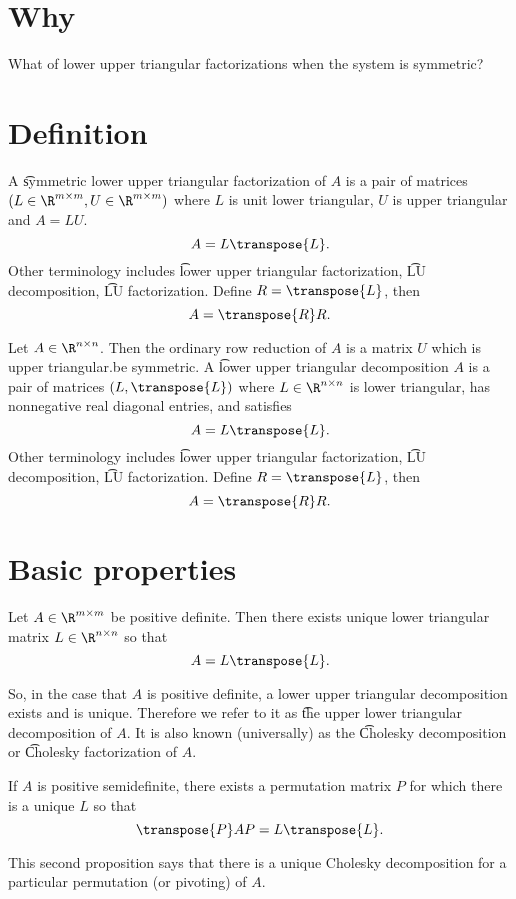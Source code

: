 

\section*{Why}

What of lower upper triangular factorizations when the system is symmetric?

\section*{Definition}

A \t{symmetric lower upper triangular factorization} of $A$ is a pair of matrices $(L \in \R ^{m \times m}, U \in \R ^{m \times m})$ where $L$ is unit lower triangular, $U$ is upper triangular and $A = LU$.
  \[
A = L\transpose{L}.
  \]
Other terminology includes \t{lower upper triangular factorization}, \t{LU decomposition}, \t{LU factorization}.
Define $R = \transpose{L}$, then
    \[
A = \transpose{R}R.
    \]

Let $A \in \R ^{n \times  n}$.
Then the ordinary row reduction of $A$ is a matrix $U$ which is upper triangular.be symmetric.
A \t{lower upper triangular decomposition}
$A$ is a pair of matrices $(L, \transpose{L})$ where $L \in \R ^{n \times n}$ is lower triangular, has nonnegative real diagonal entries, and satisfies
    \[
A = L\transpose{L}.
    \]
Other terminology includes \t{lower upper triangular factorization}, \t{LU decomposition}, \t{LU factorization}.
Define $R = \transpose{L}$, then
    \[
A = \transpose{R}R.
    \]

\section*{Basic properties}

\begin{proposition}
Let $A \in \R ^{m \times m}$ be positive definite. Then there exists unique lower triangular matrix $L \in \R ^{n \times n}$ so that
  \[
A = L\transpose{L}.
  \]\end{proposition}
So, in the case that $A$ is positive definite, a lower upper triangular decomposition exists and is unique.
Therefore we refer to it as \t{the upper lower triangular decomposition} of $A$.
It is also known (universally) as the \t{Cholesky decomposition} or \t{Cholesky factorization} of $A$.

\begin{proposition}
If $A$ is positive semidefinite, there exists a permutation matrix $P$ for which there is a unique $L$ so that
  \[
\transpose{P}AP = L\transpose{L}.
  \]\end{proposition}
This second proposition says that there is a unique Cholesky decomposition for a particular permutation (or pivoting) of $A$.


